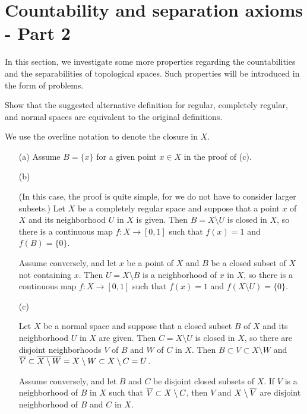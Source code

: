 \section{Countability and separation axioms - Part 2}

In this section, we investigate some more properties regarding the countabilities and the separabilities of topological spaces.
Such properties will be introduced in the form of problems.

\begin{prob}\label{separability equivalences}
    Show that the suggested alternative definition for regular, completely regular, and normal spaces are equivalent to the original definitions.
\end{prob}
\begin{sol}
    We use the overline notation to denote the closure in $X$.
    \begin{enumerate}
        \item[(a)]
        {
            Assume $B=\{x\}$ for a given point $x\in X$ in the proof of (c).
        }
        \item[(b)]
        {
            (In this case, the proof is quite simple, for we do not have to consider larger subsets.)
            Let $X$ be a completely regular space and suppose that a point $x$ of $X$ and its neighborhood $U$ in $X$ is given.
            Then $B=X\setminus U$ is closed in $X$, so there is a continuous map $f: X\rightarrow [0, 1]$ such that $f(x)=1$ and $f(B)=\{0\}$.

            Assume conversely, and let $x$ be a point of $X$ and $B$ be a closed subset of $X$ not containing $x$.
            Then $U=X\setminus B$ is a neighborhood of $x$ in $X$, so there is a continuous map $f: X\rightarrow [0, 1]$ such that $f(x)=1$ and $f(X\setminus U)=\{0\}$.
        }
        \item[(c)]
        {
            Let $X$ be a normal space and suppose that a closed subset $B$ of $X$ and its neighborhood $U$ in $X$ are given.
            Then $C=X\setminus U$ is closed in $X$, so there are disjoint neighborhoods $V$ of $B$ and $W$ of $C$ in $X$.
            Then $B\subset V\subset X\setminus W$ and $\overline{V}\subset\overline{X\setminus W}=X\setminus W\subset X\setminus C=U$.

            Assume conversely, and let $B$ and $C$ be disjoint closed subsets of $X$.
            If $V$ is a neighborhood of $B$ in $X$ such that $\overline{V}\subset X\setminus C$, then $V$ and $X\setminus\overline{V}$ are disjoint neighborhood of $B$ and $C$ in $X$.
        }
    \end{enumerate}   
\end{sol}

